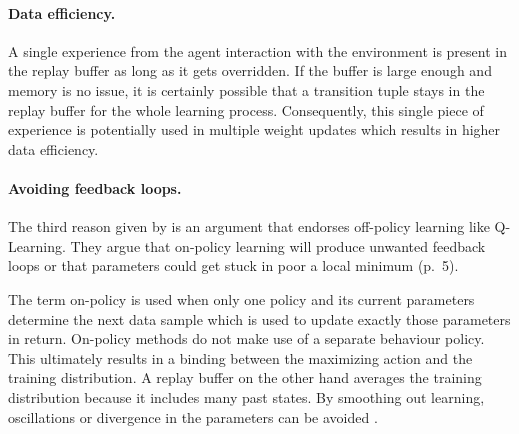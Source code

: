 \paragraph{Data efficiency.} A single experience from the agent interaction with the environment is present in the replay buffer as long as it gets overridden. If the buffer is large enough and memory is no issue, it is certainly possible that a transition tuple stays in the replay buffer for the whole learning process. Consequently, this single piece of experience is potentially used in multiple weight updates which results in higher data efficiency.

\paragraph{Avoiding feedback loops.} The third reason given by \cite{mnih2013playing} is an argument that endorses off-policy learning like Q-Learning. They argue that on-policy learning will produce unwanted feedback loops or that parameters could get stuck in poor a local minimum (p.~5). 
\par 
The term on-policy is used when only one policy and its current parameters determine the next data sample which is used to update exactly those parameters in return. On-policy methods do not make use of a separate behaviour policy. This ultimately results in a  binding between the maximizing action and the training distribution. A replay buffer on the other hand averages the training distribution because it includes many past states. By smoothing out learning,
oscillations or divergence in the parameters can be avoided \cite[p.~5]{mnih2013playing}.